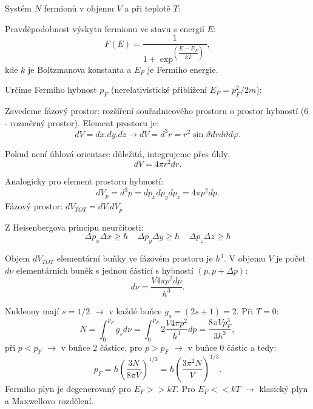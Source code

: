 \documentclass[../../main.tex]{subfiles}
\begin{document}
Systém $N$ fermionů v objemu $V$ a při teplotě $T$:

Pravděpodobnost výskytu fermionu ve stavu s energií $E$:
\begin{equation}
F(E) = \dfrac{1}{1 + \exp ^ (\dfrac{E - E_F}{kT}) },
\end{equation}
kde $k$ je Boltzmanova konstanta a $E_F$ je Fermiho energie.

Určíme Fermiho hybnost $p_F$ (nerelativistické přiblížení $E_F = p_{F}^2 /2m$):\par
Zavedeme fázový prostor: rozšíření souřadnicového prostoru o prostor hybností (6 - rozměrný prostor). Element prostoru je:
\begin{equation}
dV = dx.dy.dz \rightarrow dV = d^3 r = r^2 \sin \vartheta dr d \vartheta d \varphi.
\end{equation}

Pokud není úhlová orientace důležitá, integrujeme přes úhly: 
\begin{equation}
dV = 4 \pi r^2 dr.
\end{equation}

Analogicky pro element prostoru hybností:
\begin{equation}
dV_p = d^3 p =dp_x dp_y dp_z = 4 \pi p^2 dp.
\end{equation}
Fázový prostor: $dV_{TOT} = dV . dV_p$

Z Heisenbergova principu neurčitosti: 
\begin{equation}
\Delta p_x \Delta x \geq \hbar ~~~~~ \Delta p_y \Delta y \geq \hbar ~~~~~ \Delta p_z \Delta z \geq \hbar 
\end{equation}

Objem $dV_{TOT}$ elementární buňky ve fázovém prostoru je $h^3$. V objemu $V$ je počet $d \nu$ elementárních buněk s jednou částicí s hybností $(p, p+\Delta p)$: 
\begin{equation}
d \nu = \dfrac{V 4 \pi p^2 dp}{h^3}.
\end{equation}

Nukleony mají $s=1/2$ $\rightarrow$ v každé buňce $g_s = (2s + 1) = 2$. Při $T=0$:
\begin{equation}
N = \int_{0}^{p_F} g_s d \nu  = \int_{0}^{p_F} 2 \dfrac{V 4 \pi p^2}{h^3} dp = \dfrac{8 \pi V p_{F}^3}{3 h^3},
\end{equation}
při $p < p_F$ $\rightarrow$ v buňce 2 částice, pro $p>p_F$ $\rightarrow$ v buňce 0 částic a tedy:
\begin{equation}
p_F = h \left( \dfrac{3N}{8 \pi V}\right)^{1/3} = \hbar  \left( \dfrac{3 \pi^2 N}{V}\right) ^{1/3}.  
\end{equation}
Fermiho plyn je degenerovaný pro $E_F >> kT$. Pro $E_F << kT$ $\rightarrow$ klasický plyn a Maxwellovo rozdělení.
\end{document}
